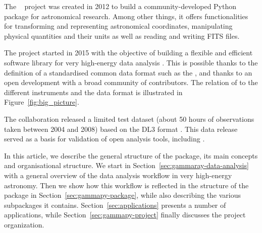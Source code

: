 \documentclass[traditabstract, longauth]{aa}
\begin{document}
The \astropy~\citep{astropy} project was created in 2012 to build a community-developed
Python package for astronomical research. Among other things, it offers functionalities for
transforming and representing astronomical coordinates, manipulating physical quantities
and their units as well as reading and writing FITS files.

The \gammapy project started in 2015 with the objective of building a flexible and
efficient software library for very high-energy \gammaray data analysis \citep{gammapy_2015}.
This is possible thanks to the definition of a standardised common data format such as the \gadf, and thanks to
an open development with a broad community of contributors. The relation of \gammapy to the
different instruments and the \gadf data format is illustrated in Figure~\ref{fig:big_picture}.


The \hess collaboration released a limited test dataset (about 50 hours of
observations taken between 2004 and 2008) based  on the \gadf DL3 format \citep{HESS_DR1}.
This data release served as a basis for validation of open analysis tools,
including \gammapy \cite[see e.g.]{Mohrmann2019}.

In this article, we describe the general structure of the \gammapy package,
its main concepts and organisational structure. We start in
Section~\ref{sec:gammaray-data-analysis} with a general overview
of the data analysis workflow in very high-energy \gammaray astronomy. Then we
show how this workflow is reflected in the structure of the \gammapy package 
in Section~\ref{sec:gammapy-package}, while also
describing the various subpackages it contains. Section~\ref{sec:applications}
presents a number of applications, while Section~\ref{sec:gammapy-project}
finally discusses the project organization.
\end{document}
